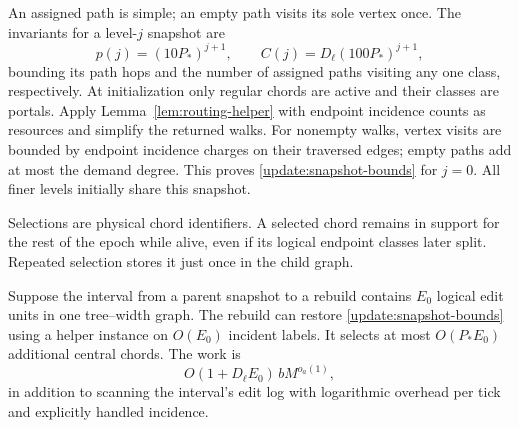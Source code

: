 An assigned path is simple; an empty path visits its sole vertex once.
The invariants for a level-$j$ snapshot are
\begin{equation}
 p(j)=(10P_*)^{j+1},\qquad
 C(j)=D_\ell(100P_*)^{j+1},
 \label{update:snapshot-bounds}
\end{equation}
bounding its path hops and the number of assigned paths visiting any
one class, respectively.  At initialization only regular chords are
active and their classes are portals.  Apply
Lemma~\ref{lem:routing-helper} with endpoint incidence counts as
resources and simplify the returned walks.  For nonempty walks,
vertex visits are bounded by endpoint incidence charges on their
traversed edges; empty paths add at most the demand degree.  This proves
\eqref{update:snapshot-bounds} for $j=0$.  All finer levels initially
share this snapshot.

Selections are physical chord identifiers.  A selected chord remains
in support for the rest of the epoch while alive, even if its logical
endpoint classes later split.  Repeated selection stores it just once
in the child graph.

\begin{lemma}
\label{update:anchor-core}
Suppose the interval from a parent snapshot to a rebuild contains
$E_0$ logical edit units in one tree--width graph.  The rebuild can
restore \eqref{update:snapshot-bounds} using a helper instance on
$O(E_0)$ incident labels.  It selects at most $O(P_*E_0)$ additional
central chords.  The work is
\begin{equation}
 O(1+D_\ell E_0)\,bM^{o_a(1)},
 \label{update:rebuild-work}
\end{equation}
in addition to scanning the interval's edit log with logarithmic
overhead per tick and explicitly handled incidence.
\end{lemma}

